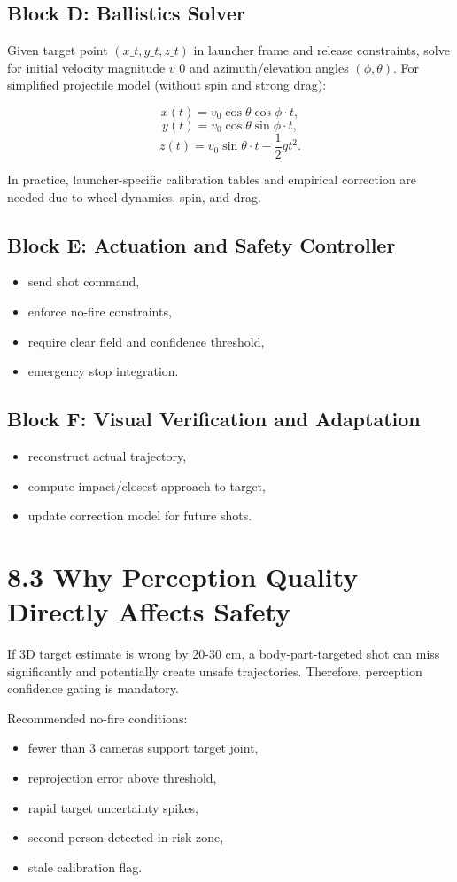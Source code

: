 \subsection{Block D: Ballistics Solver}
Given target point \((x\_t, y\_t, z\_t)\) in launcher frame and release constraints, solve for initial velocity magnitude \(v\_0\) and azimuth/elevation angles \((\phi, \theta)\). For simplified projectile model (without spin and strong drag):

\[
x(t)=v_0\cos\theta\cos\phi \cdot t,
\]
\[
y(t)=v_0\cos\theta\sin\phi \cdot t,
\]
\[
z(t)=v_0\sin\theta\cdot t - \frac{1}{2}gt^2.
\]

In practice, launcher-specific calibration tables and empirical correction are needed due to wheel dynamics, spin, and drag.

\subsection{Block E: Actuation and Safety Controller}
\begin{itemize}
  \item send shot command,
  \item enforce no-fire constraints,
  \item require clear field and confidence threshold,
  \item emergency stop integration.
\end{itemize}

\subsection{Block F: Visual Verification and Adaptation}
\begin{itemize}
  \item reconstruct actual trajectory,
  \item compute impact/closest-approach to target,
  \item update correction model for future shots.
\end{itemize}

\section{8.3 Why Perception Quality Directly Affects Safety}
If 3D target estimate is wrong by 20-30 cm, a body-part-targeted shot can miss significantly and potentially create unsafe trajectories. Therefore, perception confidence gating is mandatory.

Recommended no-fire conditions:
\begin{itemize}
  \item fewer than 3 cameras support target joint,
  \item reprojection error above threshold,
  \item rapid target uncertainty spikes,
  \item second person detected in risk zone,
  \item stale calibration flag.
\end{itemize}

